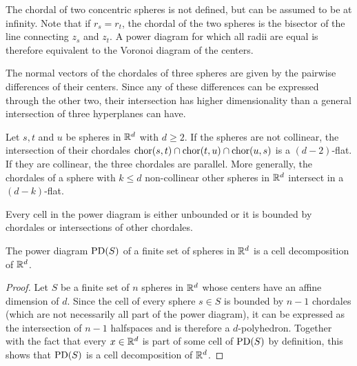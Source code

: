 The chordal of two concentric spheres is not defined, but can be assumed to be at infinity.
Note that if $r_s = r_t$, the chordal of the two spheres is the bisector of the line connecting $z_s$ and $z_t$.
A power diagram for which all radii are equal is therefore equivalent to the Voronoi diagram of the centers.

The normal vectors of the chordales of three spheres are given by the pairwise differences of their centers.
Since any of these differences can be expressed through the other two, their intersection has higher dimensionality than a general intersection of three hyperplanes can have.
\begin{lemma}
    \label{lem:cellsarepolyhedra}
    Let $s, t$ and $u$ be spheres in $\mathbb{R}^d$ with $d \geq 2$.
    If the spheres are not collinear, the intersection of their chordales $\operatorname{chor}(s,t) \cap \operatorname{chor}(t, u) \cap \operatorname{chor}(u, s)$ is a $(d-2)$-flat.
    If they are collinear, the three chordales are parallel.
    More generally, the chordales of a sphere with $k \leq d$ non-collinear other spheres in $\mathbb{R}^d$ intersect in a $(d-k)$-flat.
\end{lemma}

Every cell in the power diagram is either unbounded or it is bounded by chordales or intersections of other chordales.
\begin{lemma}
    The power diagram $\operatorname{PD}(S)$ of a finite set of spheres in $\mathbb{R}^d$ is a cell decomposition of $\mathbb{R}^d$.
\end{lemma}
\begin{proof}
    Let $S$ be a finite set of $n$ spheres in $\mathbb{R}^d$ whose centers have an affine dimension of $d$.
    Since the cell of every sphere $s \in S$ is bounded by $n - 1$ chordales (which are not necessarily all part of the power diagram), it can be expressed as the intersection of $n - 1$ halfspaces and is therefore a $d$-polyhedron.
    Together with the fact that every $x \in \mathbb{R}^d$ is part of some cell of $\operatorname{PD}(S)$ by definition, this shows that $\operatorname{PD}(S)$ is a cell decomposition of $\mathbb{R}^d$.
\end{proof}


